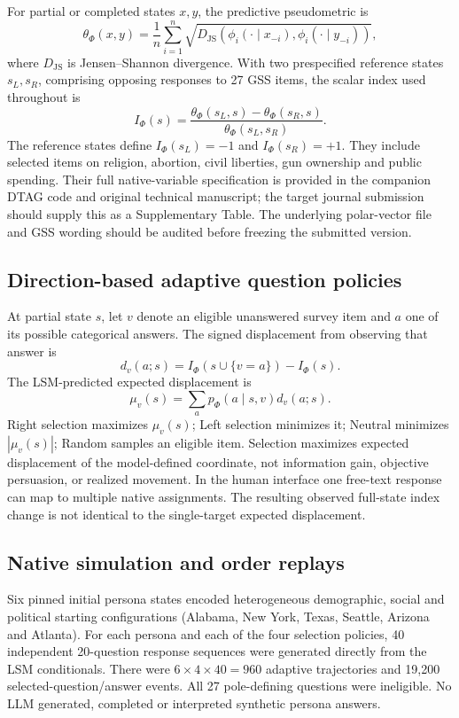 \documentclass[11pt]{article}
\newcommand{\Ph}{\Phi}
\newcommand{\JS}{D_{\mathrm{JS}}}
\newcommand{\Iidx}{I_{\Ph}}
\begin{document}
For partial or completed states $x,y$, the predictive pseudometric is
\begin{equation}
\theta_{\Ph}(x,y)=\frac{1}{n}\sum_{i=1}^{n}
\sqrt{\JS\!\left(\phi_i(\cdot\mid x_{-i}),
                      \phi_i(\cdot\mid y_{-i})\right)},
\end{equation}
where $\JS$ is Jensen--Shannon divergence. With two prespecified reference states $s_L,s_R$, comprising opposing responses to 27 GSS items, the scalar index used throughout is
\begin{equation}
\Iidx(s)=
\frac{\theta_{\Ph}(s_L,s)-\theta_{\Ph}(s_R,s)}
     {\theta_{\Ph}(s_L,s_R)}.
\label{eq:nhb-index}
\end{equation}
The reference states define $\Iidx(s_L)=-1$ and $\Iidx(s_R)=+1$. They include selected items on religion, abortion, civil liberties, gun ownership and public spending. Their full native-variable specification is provided in the companion DTAG code and original technical manuscript; the target journal submission should supply this as a Supplementary Table. The underlying polar-vector file and GSS wording should be audited before freezing the submitted version.

\subsection*{Direction-based adaptive question policies}
At partial state $s$, let $v$ denote an eligible unanswered survey item and $a$ one of its possible categorical answers. The signed displacement from observing that answer is
\begin{equation}
d_v(a;s)=\Iidx(s\cup\{v=a\})-\Iidx(s).
\end{equation}
The LSM-predicted expected displacement is
\begin{equation}
\mu_v(s)=\sum_{a}p_{\Ph}(a\mid s,v)d_v(a;s).
\end{equation}
Right selection maximizes $\mu_v(s)$; Left selection minimizes it; Neutral minimizes $|\mu_v(s)|$; Random samples an eligible item. Selection maximizes expected displacement of the model-defined coordinate, not information gain, objective persuasion, or realized movement. In the human interface one free-text response can map to multiple native assignments. The resulting observed full-state index change is not identical to the single-target expected displacement.

\subsection*{Native simulation and order replays}
Six pinned initial persona states encoded heterogeneous demographic, social and political starting configurations (Alabama, New York, Texas, Seattle, Arizona and Atlanta). For each persona and each of the four selection policies, 40 independent 20-question response sequences were generated directly from the LSM conditionals. There were $6\times 4\times 40=960$ adaptive trajectories and 19,200 selected-question/answer events. All 27 pole-defining questions were ineligible. No LLM generated, completed or interpreted synthetic persona answers.
\end{document}
